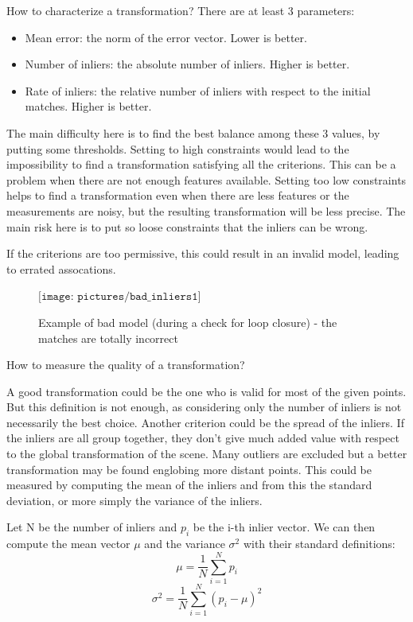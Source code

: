How to characterize a transformation? There are at least 3 parameters:
\begin{itemize}
\item Mean error: the norm of the error vector. Lower is better.
\item Number of inliers: the absolute number of inliers. Higher is better.
\item Rate of inliers: the relative number of inliers with respect to the initial matches. Higher is better.
\end{itemize}

The main difficulty here is to find the best balance among these 3 values, by putting some thresholds. Setting to high constraints would lead to the impossibility to find a transformation satisfying all the criterions. This can be a problem when there are not enough features available. Setting too low constraints helps to find a transformation even when there are less features or the measurements are noisy, but the resulting transformation will be less precise. The main risk here is to put so loose constraints that the inliers can be wrong.

If the criterions are too permissive, this could result in an invalid model, leading to errated assocations. 

\begin{figure}[h!]
\centering$
\texttt{[image: pictures/bad\_inliers1]}$
\caption{Example of bad model (during a check for loop closure) - the matches are totally incorrect}
\end{figure}

\clearpage

How to measure the quality of a transformation?

A good transformation could be the one who is valid for most of the given points. But this definition is not enough, as considering only the number of inliers is not necessarily the best choice. Another criterion could be the spread of the inliers. If the inliers are all group together, they don't give much added value with respect to the global transformation of the scene. Many outliers are excluded but a better transformation may be found englobing more distant points. This could be measured by computing the mean of the inliers and from this the standard deviation, or more simply the variance of the inliers.

Let N be the number of inliers and $p_i$ be the i-th inlier vector. We can then compute the mean vector $\mu$ and the variance $\sigma^2$ with their standard definitions:
\[
\mu = \frac{1}{N} \sum_{i=1}^N{p_i}
\]
\[
\sigma^2 = \frac{1}{N} \sum_{i=1}^N{(p_i - \mu)^2}
\]

